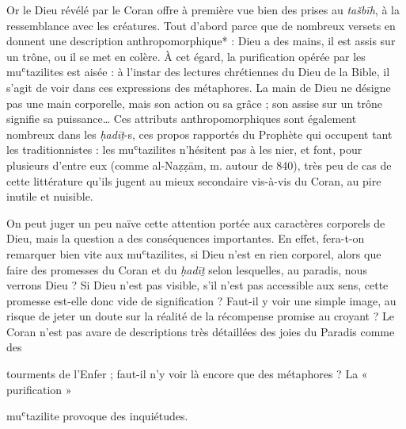 Or le Dieu révélé par le Coran offre à première vue bien des prises au
\emph{tašbīh}, à la ressemblance avec les créatures. Tout d'abord parce
que de nombreux versets en donnent une description anthropomorphique* :
Dieu a des mains, il est assis sur un trône, ou il se met en colère. À
cet égard, la purification opérée par les muʿtazilites est aisée : à
l'instar des lectures chrétiennes du Dieu de la Bible, il s'agit de voir
dans ces expressions des métaphores. La main de Dieu ne désigne pas une
main corporelle, mais son action ou sa grâce ; son assise sur un trône
signifie sa puissance\ldots{} Ces attributs anthropomorphiques sont
également nombreux dans les \emph{ḥadīṯ}-s, ces propos rapportés du
Prophète qui occupent tant les traditionnistes : les muʿtazilites
n'hésitent pas à les nier, et font, pour plusieurs d'entre eux (comme
al-Naẓẓām, m. autour de 840), très peu de cas de cette littérature
qu'ils jugent au mieux secondaire vis-à-vis du Coran, au pire inutile et
nuisible.

On peut juger un peu naïve cette attention portée aux caractères
corporels de Dieu, mais la question a des conséquences importantes. En
effet, fera-t-on remarquer bien vite aux muʿtazilites, si Dieu n'est en
rien corporel, alors que faire des promesses du Coran et du \emph{ḥadīṯ}
selon lesquelles, au paradis, nous verrons Dieu ? Si Dieu n'est pas
visible, s'il n'est pas accessible aux sens, cette promesse est-elle
donc vide de signification ? Faut-il y voir une simple image, au risque
de jeter un doute sur la réalité de la récompense promise au croyant ?
Le Coran n'est pas avare de descriptions très détaillées des joies du
Paradis comme des

tourments de l'Enfer ; faut-il n'y voir là encore que des métaphores ?
La « purification »

muʿtazilite provoque des inquiétudes.

